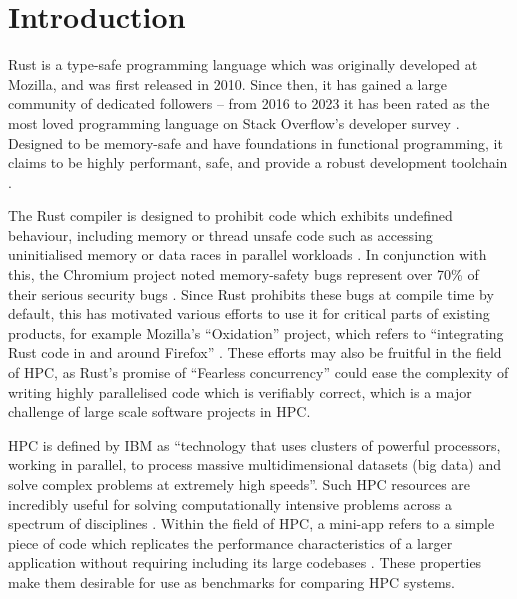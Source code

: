 \chapter{Introduction}
\label{ch:introduction}

Rust is a type-safe programming language which was originally developed at Mozilla, and was first released in 2010. Since then, it has gained a large community of dedicated followers -- from 2016 to 2023 it has been rated as the most loved programming language on Stack Overflow's developer survey \cite{StackOverflowDeveloper}. Designed to be memory-safe and have foundations in functional programming, it claims to be highly performant, safe, and provide a robust development toolchain \cite{RustProgrammingLanguage}.

The Rust compiler is designed to prohibit code which exhibits undefined behaviour, including memory or thread unsafe code such as accessing uninitialised memory or data races in parallel workloads \cite{BehaviorConsideredUndefined}. In conjunction with this, the Chromium project noted memory-safety bugs represent over 70\% of their serious security bugs \cite{MemorySafety}. Since Rust prohibits these bugs at compile time by default, this has motivated various efforts to use it for critical parts of existing products, for example Mozilla's ``Oxidation'' project, which refers to ``integrating Rust code in and around Firefox'' \cite{OxidationMozillaWiki}. These efforts may also be fruitful in the field of \acrfull{HPC}, as Rust's promise of ``Fearless concurrency'' \cite{klabnikFearlessConcurrency2018} could ease the complexity of writing highly parallelised code which is verifiably correct, which is a major challenge of large scale software projects in \acrshort{HPC}.

\acrshort{HPC} is defined by IBM as ``technology that uses clusters of powerful processors, working in parallel, to process massive multidimensional datasets (big data) and solve complex problems at extremely high speeds''\cite{WhatHPCIntroduction}. Such \acrshort{HPC} resources are incredibly useful for solving computationally intensive problems across a spectrum of disciplines \cite{JournalDescriptionInternational}.
Within the field of \acrshort{HPC}, a \acrfull{mini-app} refers to a simple piece of code which replicates the performance characteristics of a larger application without requiring including its large codebases \cite{heroux2013mantevo}. These properties make them desirable for use as benchmarks for comparing \acrshort{HPC} systems.

